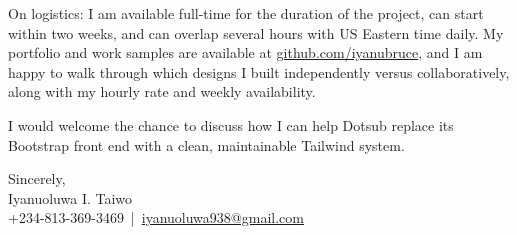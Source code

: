 \documentclass[a4paper, 12pt]{article}
\begin{document}
	On logistics: I am available full-time for the duration of the project, can
	start within two weeks, and can overlap several hours with US Eastern time
	daily. My portfolio and work samples are available at
	\href{https://github.com/iyanubruce}{github.com/iyanubruce}, and I am happy to
	walk through which designs I built independently versus collaboratively, along
	with my hourly rate and weekly availability.

	I would welcome the chance to discuss how I can help Dotsub replace its
	Bootstrap front end with a clean, maintainable Tailwind system.

	\vspace{10pt}

	\noindent
	Sincerely,\\ Iyanuoluwa I. Taiwo\\ +234-813-369-3469 \,|\, \href{mailto:iyanuoluwa938@gmail.com}{iyanuoluwa938@gmail.com}
\end{document}
